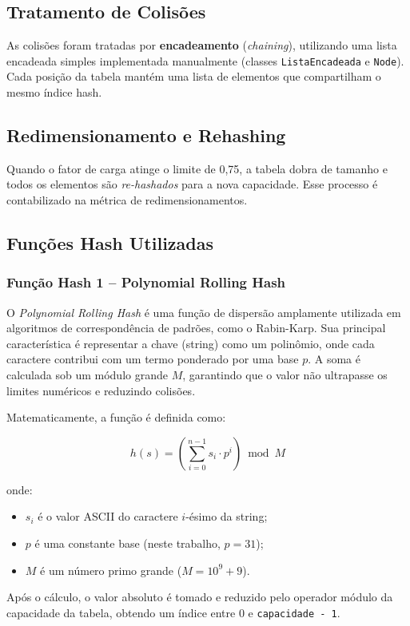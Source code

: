\documentclass[12pt,a4paper]{abntex2}
\begin{document}
\subsection{Tratamento de Colisões}
As colisões foram tratadas por \textbf{encadeamento} (\textit{chaining}), utilizando uma lista encadeada simples implementada manualmente (classes \texttt{ListaEncadeada} e \texttt{Node}). Cada posição da tabela mantém uma lista de elementos que compartilham o mesmo índice hash.

\subsection{Redimensionamento e Rehashing}
Quando o fator de carga atinge o limite de 0,75, a tabela dobra de tamanho e todos os elementos são \textit{re-hashados}  para a nova capacidade. Esse processo é contabilizado na métrica de redimensionamentos.

\subsection{Funções Hash Utilizadas}

\subsubsection{Função Hash 1 -- Polynomial Rolling Hash}
O \textit{Polynomial Rolling Hash} é uma função de dispersão amplamente utilizada em algoritmos de correspondência de padrões, como o Rabin-Karp.  
Sua principal característica é representar a chave (string) como um polinômio, onde cada caractere contribui com um termo ponderado por uma base \(p\).  
A soma é calculada sob um módulo grande \(M\), garantindo que o valor não ultrapasse os limites numéricos e reduzindo colisões.

Matematicamente, a função é definida como:

\[
h(s) = \left( \sum_{i=0}^{n-1} s_i \cdot p^i \right) \bmod M
\]

onde:
\begin{itemize}
  \item \(s_i\) é o valor ASCII do caractere \(i\)-ésimo da string;
  \item \(p\) é uma constante base (neste trabalho, \(p = 31\));
  \item \(M\) é um número primo grande (\(M = 10^9 + 9\)).
\end{itemize}

Após o cálculo, o valor absoluto é tomado e reduzido pelo operador módulo da capacidade da tabela, obtendo um índice entre \(0\) e \texttt{capacidade - 1}.
\end{document}

